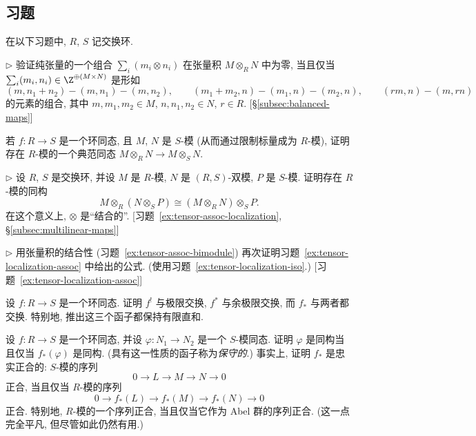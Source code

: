 \subsection*{习题}
{}

在以下习题中, $R$, $S$ 记交换环.

\begin{prob}\label{ex:balanced-tensor-kernel}
$\triangleright$ 验证纯张量的一个组合 $\sum_i(m_i\otimes n_i)$ 在张量积 $M\otimes_R N$ 中为零, 当且仅当 $\sum_i(m_i,n_i)\in\Z^{\oplus(M\times N)}$ 是形如
\[
(m,n_1+n_2)-(m,n_1)-(m,n_2),\qquad
(m_1+m_2,n)-(m_1,n)-(m_2,n),\qquad
(rm,n)-(m,rn)
\]
的元素的组合, 其中 $m,m_1,m_2\in M$, $n,n_1,n_2\in N$, $r\in R$. [\S\ref{subsec:balanced-maps}]
\end{prob}

\begin{prob}\label{ex:tensor-restriction-map}
若 $f:R\to S$ 是一个环同态, 且 $M$, $N$ 是 $S$-模 (从而通过限制标量成为 $R$-模), 证明存在 $R$-模的一个典范同态 $M\otimes_R N\to M\otimes_S N$.
\end{prob}

\begin{prob}\label{ex:tensor-assoc-bimodule}
$\triangleright$ 设 $R$, $S$ 是交换环, 并设 $M$ 是 $R$-模, $N$ 是 $(R,S)$-双模, $P$ 是 $S$-模. 证明存在 $R$-模的同构
\[
M\otimes_R(N\otimes_S P)\cong(M\otimes_R N)\otimes_S P.
\]
在这个意义上, $\otimes$ 是``结合的''. [习题~\ref{ex:tensor-assoc-localization}, §\ref{subsec:multilinear-maps}]
\end{prob}

\begin{prob}\label{ex:tensor-assoc-localization}
$\triangleright$ 用张量积的结合性 (习题~\ref{ex:tensor-assoc-bimodule}) 再次证明习题~\ref{ex:tensor-localization-assoc} 中给出的公式. (使用习题~\ref{ex:tensor-localization-iso}.) [习题~\ref{ex:tensor-localization-assoc}]
\end{prob}

\begin{prob}\label{ex:base-change-limits}
设 $f:R\to S$ 是一个环同态. 证明 $f^!$ 与极限交换, $f^*$ 与余极限交换, 而 $f_*$ 与两者都交换. 特别地, 推出这三个函子都保持有限直和.
\end{prob}

\begin{prob}\label{ex:restriction-faithfully-exact}
设 $f:R\to S$ 是一个环同态, 并设 $\varphi:N_1\to N_2$ 是一个 $S$-模同态. 证明 $\varphi$ 是同构当且仅当 $f_*(\varphi)$ 是同构. (具有这一性质的函子称为\emph{保守的}.) 事实上, 证明 $f_*$ 是忠实正合的: $S$-模的序列
\[
0\longrightarrow L\longrightarrow M\longrightarrow N\longrightarrow 0
\]
正合, 当且仅当 $R$-模的序列
\[
0\longrightarrow f_*(L)\longrightarrow f_*(M)\longrightarrow f_*(N)\longrightarrow 0
\]
正合. 特别地, $R$-模的一个序列正合, 当且仅当它作为 Abel 群的序列正合. (这一点完全平凡, 但尽管如此仍然有用.)
\end{prob}

